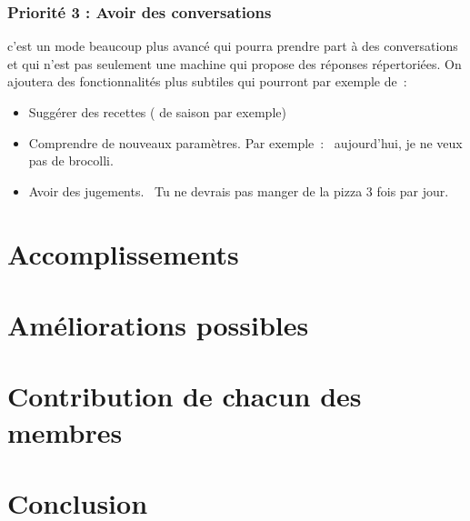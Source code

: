 \documentclass{report}
\begin{document}
\subsubsection{Priorité 3 : Avoir des conversations } c'est un mode beaucoup plus avancé qui pourra prendre part à des conversations et qui n'est pas seulement une machine qui propose des réponses répertoriées. On ajoutera des fonctionnalités plus subtiles qui pourront par exemple de :
\begin{itemize}
\item Suggérer des recettes ( de saison par exemple)
\item Comprendre de nouveaux paramètres. Par exemple : \og aujourd'hui, je ne veux pas de brocolli. \fg{}
\item Avoir des jugements. \og Tu ne devrais pas manger de la pizza 3 fois par jour.\fg{}
\end{itemize}
\section{Accomplissements}
\section{Améliorations possibles}
\section{Contribution de chacun des membres}
\section*{Conclusion}
\end{document}
